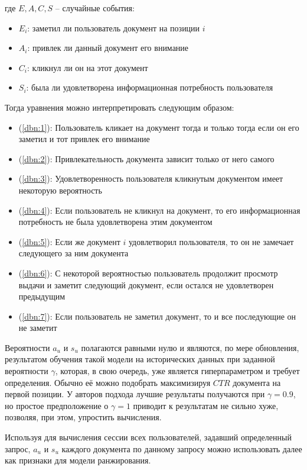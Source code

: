 \documentclass[diploma]{nanolab2015}
\begin{document}
где $E, A, C, S$ -- случайные события:
\begin{itemize}
    \item $E_i$: заметил ли пользователь документ на позиции $i$
    \item $A_i$: привлек ли данный документ его внимание
    \item $C_i$: кликнул ли он на этот документ
    \item $S_i$: была ли удовлетворена информационная потребность пользователя
\end{itemize}
Тогда уравнения можно интерпретировать следующим образом:
\begin{itemize}
    \item (\ref{dbn:1}): Пользователь кликает на документ тогда и только тогда если он его заметил и тот привлек его внимание
    \item (\ref{dbn:2}): Привлекательность документа зависит только от него самого
    \item (\ref{dbn:3}): Удовлетворенность пользователя кликнутым документом имеет некоторую вероятность
    \item (\ref{dbn:4}): Если пользователь не кликнул на документ, то его информационная потребность не была удовлетворена этим документом
    \item (\ref{dbn:5}): Если же документ $i$ удовлетворил пользователя, то он не замечает следующего за ним документа
    \item (\ref{dbn:6}): С некоторой вероятностью пользователь продолжит просмотр выдачи и заметит следующий документ, если остался не удовлетворен предыдущим
    \item (\ref{dbn:7}): Если пользователь не заметил документ, то и все последующие он не заметит
\end{itemize}

Вероятности $a_u$ и $s_u$ полагаются равными нулю и являются, по мере обновления, результатом обучения такой модели на исторических данных при заданной вероятности $\gamma$, которая, в свою очередь, уже является гиперпараметром и требует определения. Обычно её можно подобрать максимизируя $CTR$ документа на первой позиции. У авторов подхода лучшие результаты получаются при $\gamma = 0.9$, но простое предположение о $\gamma = 1$ приводит к результатам не сильно хуже, позволяя, при этом, упростить вычисления.

Используя для вычисления сессии всех пользователей, задавший определенный запрос, $a_u$ и $s_u$ каждого документа по данному запросу можно использовать далее как признаки для модели ранжирования.
\end{document}
